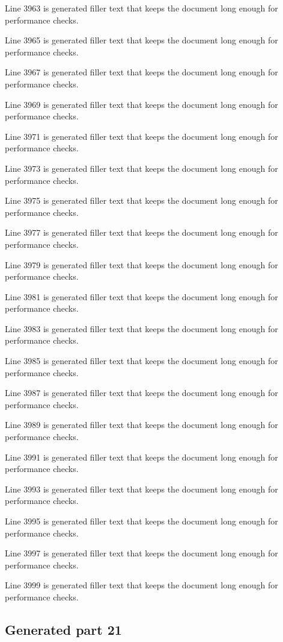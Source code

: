 Line 3963 is generated filler text that keeps the document long enough for performance checks.

Line 3965 is generated filler text that keeps the document long enough for performance checks.

Line 3967 is generated filler text that keeps the document long enough for performance checks.

Line 3969 is generated filler text that keeps the document long enough for performance checks.

Line 3971 is generated filler text that keeps the document long enough for performance checks.

Line 3973 is generated filler text that keeps the document long enough for performance checks.

Line 3975 is generated filler text that keeps the document long enough for performance checks.

Line 3977 is generated filler text that keeps the document long enough for performance checks.

Line 3979 is generated filler text that keeps the document long enough for performance checks.

Line 3981 is generated filler text that keeps the document long enough for performance checks.

Line 3983 is generated filler text that keeps the document long enough for performance checks.

Line 3985 is generated filler text that keeps the document long enough for performance checks.

Line 3987 is generated filler text that keeps the document long enough for performance checks.

Line 3989 is generated filler text that keeps the document long enough for performance checks.

Line 3991 is generated filler text that keeps the document long enough for performance checks.

Line 3993 is generated filler text that keeps the document long enough for performance checks.

Line 3995 is generated filler text that keeps the document long enough for performance checks.

Line 3997 is generated filler text that keeps the document long enough for performance checks.

Line 3999 is generated filler text that keeps the document long enough for performance checks.

\subsection{Generated part 21}

